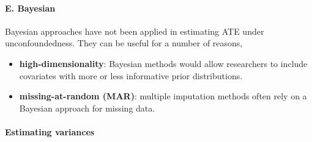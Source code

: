 \documentclass[twoside]{article}
\begin{document}
\paragraph*{E. Bayesian}
Bayesian approaches have not been applied in estimating ATE under unconfoundedness. They can be useful for a number of reasons,
\begin{itemize}
    \item \textbf{high-dimensionality}: Bayesian methods would allow researchers to include covariates with more or less informative prior distributions.
    \item \textbf{missing-at-random (MAR)}: multiple imputation methods often rely on a Bayesian approach for missing data.
\end{itemize}

\paragraph*{Estimating variances}
\end{document}

